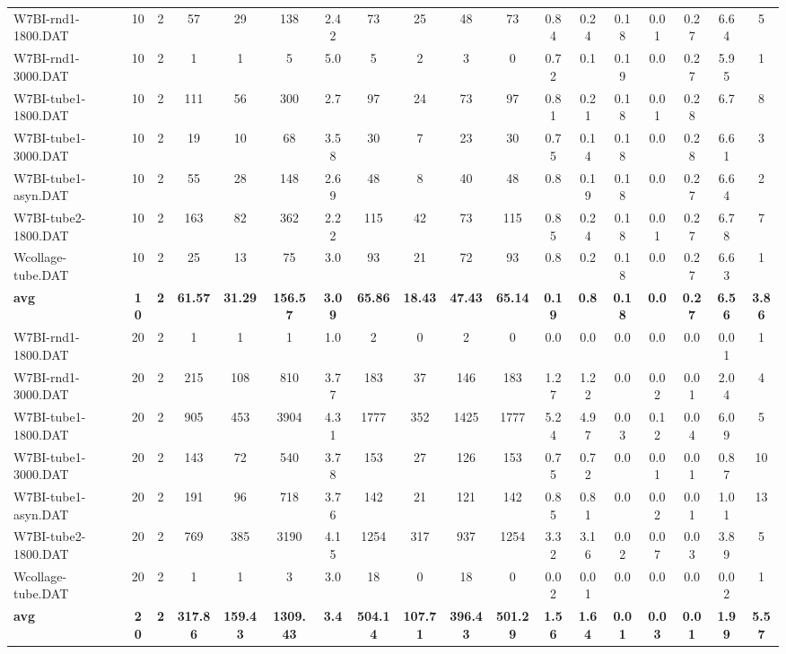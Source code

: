 \begin{sidewaystable}[h]
{\begin{tabular}{lccccccccccccccccc}
W7BI-rnd1-1800.DAT & 10 & 2 & 57 & 29 & 138 & 2.42 & 73 & 25 & 48 & 73 & 0.84 & 0.24 & 0.18 & 0.01 & 0.27 & 6.64 & 5\\
W7BI-rnd1-3000.DAT & 10 & 2 & 1 & 1 & 5 & 5.0 & 5 & 2 & 3 & 0 & 0.72 & 0.1 & 0.19 & 0.0 & 0.27 & 5.95 & 1\\
W7BI-tube1-1800.DAT & 10 & 2 & 111 & 56 & 300 & 2.7 & 97 & 24 & 73 & 97 & 0.81 & 0.21 & 0.18 & 0.01 & 0.28 & 6.7 & 8\\
W7BI-tube1-3000.DAT & 10 & 2 & 19 & 10 & 68 & 3.58 & 30 & 7 & 23 & 30 & 0.75 & 0.14 & 0.18 & 0.0 & 0.28 & 6.61 & 3\\
W7BI-tube1-asyn.DAT & 10 & 2 & 55 & 28 & 148 & 2.69 & 48 & 8 & 40 & 48 & 0.8 & 0.19 & 0.18 & 0.0 & 0.27 & 6.64 & 2\\
W7BI-tube2-1800.DAT & 10 & 2 & 163 & 82 & 362 & 2.22 & 115 & 42 & 73 & 115 & 0.85 & 0.24 & 0.18 & 0.01 & 0.27 & 6.78 & 7\\
Wcollage-tube.DAT & 10 & 2 & 25 & 13 & 75 & 3.0 & 93 & 21 & 72 & 93 & 0.8 & 0.2 & 0.18 & 0.0 & 0.27 & 6.63 & 1\\
\cline{1-18} \textbf{avg} & \textbf{10} & \textbf{2} & \textbf{61.57} & \textbf{31.29} & \textbf{156.57} & \textbf{3.09} & \textbf{65.86} & \textbf{18.43} & \textbf{47.43} & \textbf{65.14} & \textbf{0.19} & \textbf{0.8} & \textbf{0.18} & \textbf{0.0} & \textbf{0.27} & \textbf{6.56} & \textbf{3.86} \\ \cline{1-18}
W7BI-rnd1-1800.DAT & 20 & 2 & 1 & 1 & 1 & 1.0 & 2 & 0 & 2 & 0 & 0.0 & 0.0 & 0.0 & 0.0 & 0.0 & 0.01 & 1\\
W7BI-rnd1-3000.DAT & 20 & 2 & 215 & 108 & 810 & 3.77 & 183 & 37 & 146 & 183 & 1.27 & 1.22 & 0.0 & 0.02 & 0.01 & 2.04 & 4\\
W7BI-tube1-1800.DAT & 20 & 2 & 905 & 453 & 3904 & 4.31 & 1777 & 352 & 1425 & 1777 & 5.24 & 4.97 & 0.03 & 0.12 & 0.04 & 6.09 & 5\\
W7BI-tube1-3000.DAT & 20 & 2 & 143 & 72 & 540 & 3.78 & 153 & 27 & 126 & 153 & 0.75 & 0.72 & 0.0 & 0.01 & 0.01 & 0.87 & 10\\
W7BI-tube1-asyn.DAT & 20 & 2 & 191 & 96 & 718 & 3.76 & 142 & 21 & 121 & 142 & 0.85 & 0.81 & 0.0 & 0.02 & 0.01 & 1.01 & 13\\
W7BI-tube2-1800.DAT & 20 & 2 & 769 & 385 & 3190 & 4.15 & 1254 & 317 & 937 & 1254 & 3.32 & 3.16 & 0.02 & 0.07 & 0.03 & 3.89 & 5\\
Wcollage-tube.DAT & 20 & 2 & 1 & 1 & 3 & 3.0 & 18 & 0 & 18 & 0 & 0.02 & 0.01 & 0.0 & 0.0 & 0.0 & 0.02 & 1\\
\cline{1-18} \textbf{avg} & \textbf{20} & \textbf{2} & \textbf{317.86} & \textbf{159.43} & \textbf{1309.43} & \textbf{3.4} & \textbf{504.14} & \textbf{107.71} & \textbf{396.43} & \textbf{501.29} & \textbf{1.56} & \textbf{1.64} & \textbf{0.01} & \textbf{0.03} & \textbf{0.01} & \textbf{1.99} & \textbf{5.57} \\ \cline{1-18}

\end{tabular}}
\end{sidewaystable}
